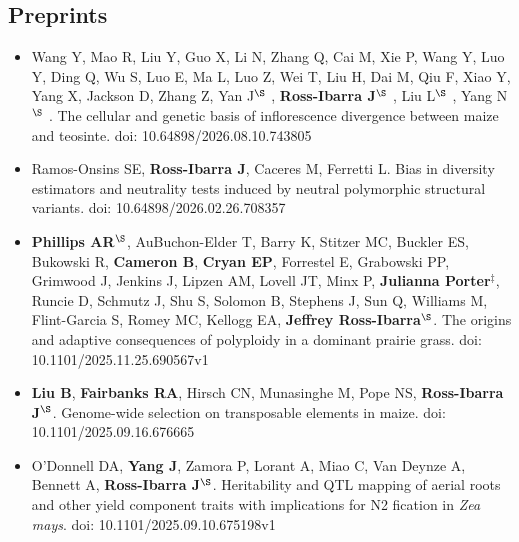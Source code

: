 \documentclass[letterpaper,10pt]{article}
\begin{document}
\subsection*{Preprints}
\begin{itemize}
  \setlength\itemsep{0ex}

\item Wang Y, Mao R, Liu Y, Guo X, Li N, Zhang Q, Cai M, Xie P, Wang Y, Luo Y, Ding Q, Wu S, Luo E, Ma L, Luo Z, Wei T, Liu H, Dai M, Qiu F, Xiao Y, Yang X, Jackson D, Zhang Z, Yan J$^\S$ , \textbf{Ross-Ibarra J}$^\S$ , Liu L$^\S$ , Yang N$^\S$ . The cellular and genetic basis of inflorescence divergence between maize and teosinte. doi: 10.64898/2026.08.10.743805\\

\item Ramos-Onsins SE, \textbf{Ross-Ibarra J}, Caceres M, Ferretti L. Bias in diversity estimators and neutrality tests induced by neutral polymorphic structural variants. doi: 10.64898/2026.02.26.708357\\

\item \textbf{Phillips AR}$^\S$,  AuBuchon-Elder T, Barry K,  Stitzer MC, Buckler ES,  Bukowski R, \textbf{Cameron B},  \textbf{Cryan EP},  Forrestel E, Grabowski PP,  Grimwood J,  Jenkins J, Lipzen AM,  Lovell JT,  Minx P, \textbf{Julianna Porter}$^\ddagger$,  Runcie D,  Schmutz J,  Shu S,  Solomon B,  Stephens J,  Sun Q,  Williams M,  Flint-Garcia S, Romey MC, Kellogg EA, \textbf{Jeffrey Ross-Ibarra}$^\S$. The origins and adaptive consequences of polyploidy in a dominant prairie grass.  doi: 10.1101/2025.11.25.690567v1\\

\item \textbf{Liu B}, \textbf{Fairbanks RA}, Hirsch CN, Munasinghe M, Pope NS, \textbf{Ross-Ibarra J}$^\S$. Genome-wide selection on transposable elements in maize.  doi: 10.1101/2025.09.16.676665 \\
  
\item O'Donnell DA, \textbf{Yang J}, Zamora P, Lorant A, Miao C, Van Deynze A, Bennett A, \textbf{Ross-Ibarra J}$^\S$. Heritability and QTL mapping of aerial roots and other yield component traits with implications for N2 fication in \textit{Zea mays}.  doi: 10.1101/2025.09.10.675198v1 \\


\end{itemize}
\end{document}
